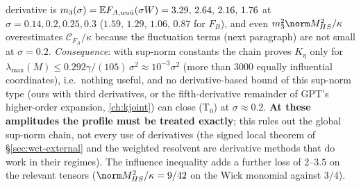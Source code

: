 derivative is $m_3(\sigma)=\mathbb E F_{A,uu\bar u}(\sigma W)=3.29,\,2.64,\,2.16,\,1.76$ at $\sigma=0.14,0.2,0.25,0.3$ ($1.59,\,1.29,\,1.06,\,0.87$ for $F_B$), and even $m_3^2\norm M_{HS}^2/\kappa$
overestimates $\mathcal C_{F_A}/\kappa$ because the fluctuation terms (next paragraph) are not small at $\sigma=0.2$. \emph{Consequence}: with sup-norm constants the chain proves $K_\eta$ only for
$\lambda_{\max}(M)\le0.292\gamma/(105)\,\sigma^2\approx10^{-3}\sigma^2$ (more than $3000$ equally influential coordinates), i.e.\ nothing useful, and no derivative-based bound of this sup-norm type (ours with third derivatives, or the fifth-derivative remainder of GPT's higher-order expansion, \autoref{ch:kjoint}) can close (T$_0$) at $\sigma\approx0.2$. \textbf{At these amplitudes the profile must be treated exactly}; this rules out the global sup-norm chain, not every use of derivatives (the signed local theorem of \S\ref{sec:wct-external} and the weighted resolvent are derivative methods that do work in their regimes). The
influence inequality adds a further loss of $2$--$3.5$ on the relevant tensors ($\norm M^2_{HS}/\kappa=9/42$ on the Wick monomial against $3/4$).

